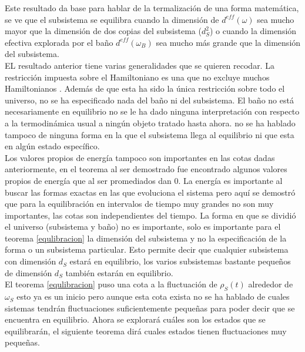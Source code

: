 Este resultado  da base para hablar de la termalización de una forma matemática, se ve que el subsistema se equilibra cuando la dimensión de $d^{eff}(\omega)$ sea mucho mayor que la dimensión de dos copias del subsistema ($d_{S}^{2}$) o cuando la dimensión efectiva explorada por el baño $d^{eff}(\omega_{B})$ sea mucho más grande que la dimensión del subsistema.
\\
EL resultado anterior tiene varias generalidades que se quieren recodar. La restricción impuesta sobre el Hamiltoniano  es una que no excluye muchos Hamiltonianos \cite{SakuraiQuantum}. Además de que esta ha sido la única restricción sobre todo el universo, no se ha especificado nada del baño ni del subsistema. El baño no está necesariamente en equilibrio no se le ha dado ninguna interpretación con respecto a la termodinámica usual a ningún objeto tratado hasta ahora. no se ha hablado tampoco de ninguna forma en la que el subsistema llega al equilibrio ni que esta en algún estado específico.
\\
Los valores propios de energía tampoco son importantes en las cotas dadas anteriormente, en el teorema al ser demostrado fue encontrado algunos valores propios de energía que al ser promediados dan 0. La energía es importante al buscar las formas exactas en las que evoluciona el sistema pero aquí se demostró que para la equilibración en intervalos de tiempo muy grandes no son muy importantes, las cotas son independientes del tiempo. La forma en que se dividió el universo (subsistema y baño) no es importante, solo es importante para el teorema \ref{equlibracion} la dimensión del subsistema y no la especificación de la forma o un subsistema particular. Esto permite decir que cualquier subsistema con dimensión $d_{S}$ estará en equilibrio, los varios subsistemas bastante pequeños de dimensión $d_{S}$ también estarán en equilibrio.
\\
El teorema \ref{equlibracion} puso una cota a la fluctuación de $\rho_{S}(t)$ alrededor de $\omega_{S}$ esto ya es un inicio pero aunque esta cota exista no se ha hablado de cuales sistemas tendrán fluctuaciones suficientemente pequeñas para poder decir que se encuentra en equilibrio. Ahora se explorará cuáles son los estados que se equilibrarán, el siguiente teorema dirá cuales estados tienen fluctuaciones muy pequeñas.

